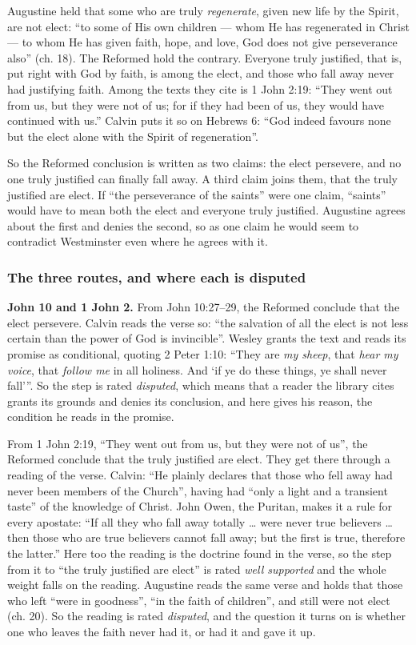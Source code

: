 \documentclass[11pt]{article}
\begin{document}
Augustine held that some who are truly \emph{regenerate}, given new life by the Spirit, are not elect: “to some of His own children — whom He has regenerated in Christ — to whom He has given faith, hope, and love, God does not give perseverance also” (ch. 18). The Reformed hold the contrary. Everyone truly justified, that is, put right with God by faith, is among the elect, and those who fall away never had justifying faith. Among the texts they cite is 1 John 2:19: “They went out from us, but they were not of us; for if they had been of us, they would have continued with us.” Calvin puts it so on Hebrews 6: “God indeed favours none but the elect alone with the Spirit of regeneration”.

So the Reformed conclusion is written as two claims: the elect persevere, and no one truly justified can finally fall away. A third claim joins them, that the truly justified are elect. If “the perseverance of the saints” were one claim, “saints” would have to mean both the elect and everyone truly justified. Augustine agrees about the first and denies the second, so as one claim he would seem to contradict Westminster even where he agrees with it.

\subsubsection*{The three routes, and where each is disputed}
\textbf{John 10 and 1 John 2.} From John 10:27–29, the Reformed conclude that the elect persevere. Calvin reads the verse so: “the salvation of all the elect is not less certain than the power of God is invincible”. Wesley grants the text and reads its promise as conditional, quoting 2 Peter 1:10: “They are \emph{my sheep}, that \emph{hear my voice}, that \emph{follow me} in all holiness. And ‘if ye do these things, ye shall never fall’”. So the step is rated \emph{disputed}, which means that a reader the library cites grants its grounds and denies its conclusion, and here gives his reason, the condition he reads in the promise.

From 1 John 2:19, “They went out from us, but they were not of us”, the Reformed conclude that the truly justified are elect. They get there through a reading of the verse. Calvin: “He plainly declares that those who fell away had never been members of the Church”, having had “only a light and a transient taste” of the knowledge of Christ. John Owen, the Puritan, makes it a rule for every apostate: “If all they who fall away totally … were never true believers … then those who are true believers cannot fall away; but the first is true, therefore the latter.” Here too the reading is the doctrine found in the verse, so the step from it to “the truly justified are elect” is rated \emph{well supported} and the whole weight falls on the reading. Augustine reads the same verse and holds that those who left “were in goodness”, “in the faith of children”, and still were not elect (ch. 20). So the reading is rated \emph{disputed}, and the question it turns on is whether one who leaves the faith never had it, or had it and gave it up.
\end{document}
